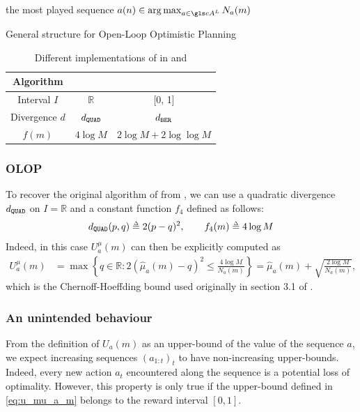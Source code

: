 \begin{algorithm}[tp]
	\DontPrintSemicolon
	\Return the most played sequence $a(n) \in \argmax_{a\in \cA^L} N_a(m)$
	\caption{General structure for Open-Loop Optimistic Planning}
	\label{alg:kl-olop}
\end{algorithm}

\begin{table}[tp]
	\caption{Different implementations of  in \OLOP and \KLOLOP}
	\label{tab:comparison}
	\centering
	\begin{tabular}{ccc}
		\toprule
		Algorithm & \OLOP & \KLOLOP \\
		\midrule
		Interval $I$ & $\mathbb{R}$ & [0, 1] \\
		Divergence $d$ & $d_\texttt{QUAD}$ & $d_\texttt{BER}$ \\
		$f(m)$ & $4 \log M$ & $2\log M + 2 \log\log M$\\
		\bottomrule
	\end{tabular}
\end{table}

\subsubsection{\gls*{OLOP}}
\label{sec:kl-olop-olop}
To recover the original \OLOP algorithm of \citet{Bubeck2010} from , we can use a quadratic divergence $d_\texttt{QUAD}$ on $I=\mathbb{R}$ and a constant function $f_4$ defined as follows:
\begin{equation*}
\dquad(p,q) \eqdef 2(p-q)^2,\qquad
f_4(m) \eqdef 4 \log M
\end{equation*}
Indeed, in this case $U^{\mu}_a(m)$ can then be explicitly computed as
\begin{align*}
U^{\mu}_a(m) &= \max \left\{q\in \mathbb{R}: 2(\hat{\mu}_a(m) - q)^2 \leq \frac{4 \log M }{N_a(m)} \right\} = \hat{\mu}_a(m) + \sqrt{\frac{2 \log M}{N_a(m)}},
\end{align*}
which is the Chernoff-Hoeffding bound used originally in section 3.1 of \citep{Bubeck2010}.

\subsubsection{An unintended behaviour}
\label{sec:kl-olop-behaviour}
From the definition of $U_a(m)$ as an upper-bound of the value of the sequence $a$, we expect increasing sequences $(a_{1:t})_t$ to have non-increasing upper-bounds. Indeed, every new action $a_t$ encountered along the sequence is a potential loss of optimality.
However, this property is only true if the upper-bound defined in \eqref{eq:u_mu_a_m} belongs to the reward interval $[0,1]$.

